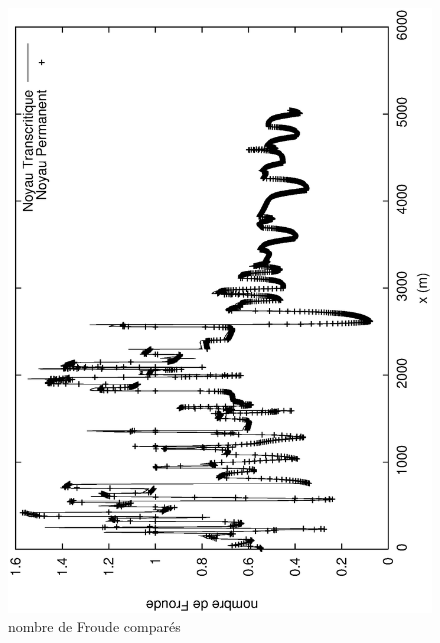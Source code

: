 \documentclass[a4paper,10pt]{article}
\begin{document}
\begin{figure}
 \begin{center}
  \includegraphics[angle=270,width=15cm]{Froude_Tr_Pr.eps}
  \caption{nombre de Froude comparés}
  \label{fig4}
 \end{center}
\end{figure}

%
%
\end{document}
